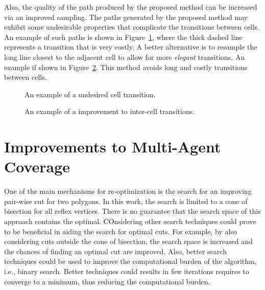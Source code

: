 \documentclass[../main.tex]{subfiles}
\begin{document}
Also, the quality of the path produced by the proposed method can be increased via an improved sampling. The paths generated by the proposed method may exhibit some undesirable properties  that complicate the transitions between cells. An example of such paths is shown in Figure~\ref{fig:cell_transition}, where the thick dashed line represents a transition that is very costly. A better alternative is to resample the long line closest to the adjacent cell to allow for more \emph{elegant} transitions. An example if shown in Figure~\ref{fig:cell_transition_better}. This method avoids long and costly transitions between cells.

\begin{figure}
	\centering
	
	\caption{An example of a undesired cell transition.}
	\label{fig:cell_transition}
\end{figure}

\begin{figure}
	\centering
	
	\caption{An example of a improvement to inter-cell transitions.}
	\label{fig:cell_transition_better}
\end{figure}


\section{Improvements to Multi-Agent Coverage}
\label{section:future_multi}

One of the main mechanisms for re-optimization is the search for an improving pair-wise cut for two polygons. In this work, the search is limited to a cone of bisection for all reflex vertices. There is no guarantee that the search space of this approach contains the optimal. COnsidering other search techniques could prove to be beneficial in aiding the search for optimal cuts. For example, by also considering cuts outside the cone of bisection, the search space is increased and the chances of finding an optimal cut are improved. Also, better search techniques could be used to improve the computational burden of the algorithm, i.e., binary search. Better techniques could results in few iterations requires to converge to a minimum, thus reducing the computational burden.
\end{document}

